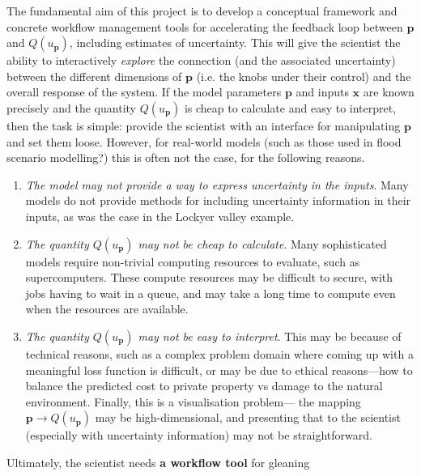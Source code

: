 \documentclass[a4paper,fontsize=12pt]{scrartcl}
\begin{document}
The fundamental aim of this project is to develop a conceptual
framework and concrete workflow management tools for accelerating the
feedback loop between $\mathbf{p}$ and $Q(u_{\mathbf{p}})$, including
estimates of uncertainty. This will give the scientist the ability to
interactively \emph{explore} the connection (and the associated
uncertainty) between the different dimensions of $\mathbf{p}$ (i.e.
the knobs under their control) and the overall response of the
system. If the model
parameters $\mathbf{p}$ and inputs $\mathbf{x}$ are known precisely
and the quantity $Q(u_{\mathbf{p}})$ is cheap to calculate and easy to
interpret, then the task is simple: provide the scientist with an
interface for manipulating $\mathbf{p}$ and set them loose. However,
for real-world models (such as those used in flood scenario
modelling?) this is often not the case, for the following reasons.
\begin{enumerate}
\item \emph{The model may not provide a way to express uncertainty in
    the inputs}. Many models do not provide methods for including
  uncertainty information in their inputs, as was the case in the
  Lockyer valley example.
\item \emph{The quantity $Q(u_{\mathbf{p}})$ may not be cheap to
    calculate}. Many sophisticated models require non-trivial
  computing resources to evaluate, such as supercomputers. These
  compute resources may be difficult to secure, with jobs having to
  wait in a queue, and may take a long time to compute even when the
  resources are available.
\item \emph{The quantity $Q(u_{\mathbf{p}})$ may not be easy to
    interpret}. This may be because of technical reasons, such as a
  complex problem domain where coming up with a meaningful loss
  function is difficult, or may be due to ethical reasons---how to
  balance the predicted cost to private property vs damage to the
  natural environment. Finally, this is a visualisation problem---
  the mapping $\mathbf{p} \rightarrow Q(u_{\mathbf{p}})$ may be high-dimensional,
  and presenting that to the scientist (especially with uncertainty
  information) may not be straightforward.
\end{enumerate}
Ultimately, the scientist needs \textbf{a workflow tool} for gleaning
\end{document}
